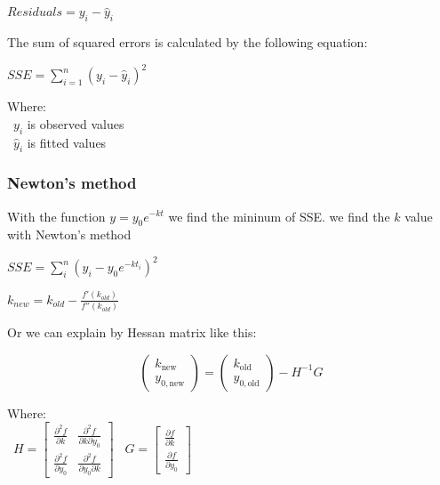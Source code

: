 \documentclass[conference]{IEEEtran}
\begin{document}
\begin{center}
    $Residuals = y_i - \widehat{y}_i$
\end{center}

The sum of squared errors is calculated by the following equation:

\begin{center}
    $SSE = \sum_{i=1}^{n}(y_i - \widehat{y}_i)^2$
\end{center}

Where: \\
\indent\textbullet\ \(y_i\) is observed values\\
\indent\textbullet\ \(\widehat{y}_i\) is fitted values\\

\subsubsection{Newton's method}
With the function \( y = y_0e^{-kt} \) we find the mininum of SSE. we find the \(k\) value with Newton's method

\begin{center}
    $SSE = \sum_{i}^{n}(y_i-y_0e^{-kt_i})^2$
\end{center}


\begin{center}

    \(k_{new} = k_{old} - \frac{f'(k_{old})}{f''(k_{old})}\)

\end{center}

Or we can explain by Hessan matrix like this:

\begin{center}
    \[
        \begin{pmatrix}
            k_{\text{new}} \\ y_{0, \text{new}}
        \end{pmatrix} =
        \begin{pmatrix}
            k_{\text{old}} \\ y_{0, \text{old}}
        \end{pmatrix} - H^{-1}G
    \]
\end{center}

Where: \\
\indent\textbullet\ \(H = \begin{bmatrix}
    \frac{\partial^2 f}{\partial k} & \frac{\partial^2 f}{\partial k \partial y_0}
    \\ \frac{\partial^2 f}{\partial y_0}  & \frac{\partial^2 f}{\partial y_0 \partial k}
\end{bmatrix}\)
\indent\textbullet\ \(G = \begin{bmatrix}
    \frac{\partial f}{\partial k} \\ \frac{\partial f}{\partial y_0}
\end{bmatrix}\)\\
\end{document}
